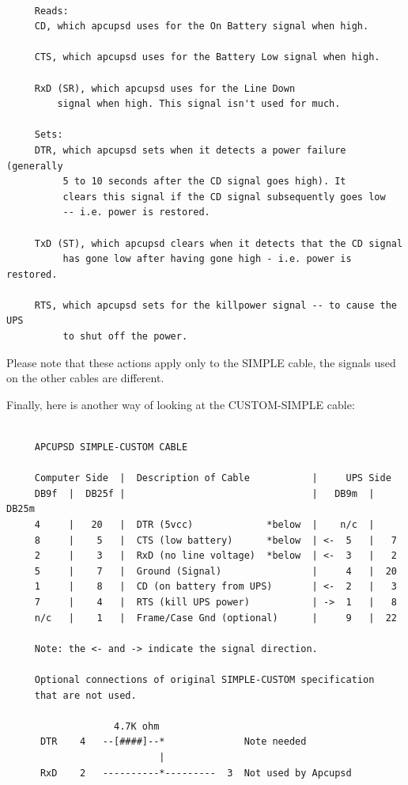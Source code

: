 {{{{{{{{{{\footnotesize
\begin{verbatim}
     
     Reads:
     CD, which apcupsd uses for the On Battery signal when high.
     
     CTS, which apcupsd uses for the Battery Low signal when high.
     
     RxD (SR), which apcupsd uses for the Line Down
         signal when high. This signal isn't used for much.
     
     Sets:
     DTR, which apcupsd sets when it detects a power failure (generally
          5 to 10 seconds after the CD signal goes high). It
          clears this signal if the CD signal subsequently goes low
          -- i.e. power is restored.
     
     TxD (ST), which apcupsd clears when it detects that the CD signal
          has gone low after having gone high - i.e. power is restored.
     
     RTS, which apcupsd sets for the killpower signal -- to cause the UPS
          to shut off the power.
\end{verbatim}
\normalsize

Please note that these actions apply only to the SIMPLE cable, the signals
used on the other cables are different.  

Finally, here is another way of looking at the CUSTOM-SIMPLE cable: 

\footnotesize
\begin{verbatim}
     
     APCUPSD SIMPLE-CUSTOM CABLE
     
     Computer Side  |  Description of Cable           |     UPS Side
     DB9f  |  DB25f |                                 |   DB9m  | DB25m
     4     |   20   |  DTR (5vcc)             *below  |    n/c  |
     8     |    5   |  CTS (low battery)      *below  | <-  5   |   7
     2     |    3   |  RxD (no line voltage)  *below  | <-  3   |   2
     5     |    7   |  Ground (Signal)                |     4   |  20
     1     |    8   |  CD (on battery from UPS)       | <-  2   |   3
     7     |    4   |  RTS (kill UPS power)           | ->  1   |   8
     n/c   |    1   |  Frame/Case Gnd (optional)      |     9   |  22
     
     Note: the <- and -> indicate the signal direction.
     
     Optional connections of original SIMPLE-CUSTOM specification
     that are not used.
     
                   4.7K ohm
      DTR    4   --[####]--*              Note needed
                           |
      RxD    2   ----------*---------  3  Not used by Apcupsd
     

\end{verbatim}}}}}}}}}}}
